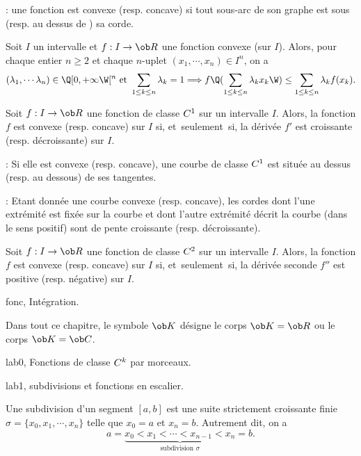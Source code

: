 \Remarque : une fonction est convexe (resp. concave) si tout sous-arc de son graphe est sous (resp. au dessus de ) sa corde.
\bigskip

\Propriete []  Soit $I$ un intervalle et $f:I\to\ob R$ une fonction convexe (sur $I$). Alors, pour chaque entier $n\ge2$ et chaque $n$-uplet $(x_1,\cdots,x_n)\in I^n$, on a 
$$
(\lambda_1,\cdots\lambda_n)\in\Q[0,+\infty\W[^n\mbox{ et }\sum_{1\le k\le n}\lambda_k=1\Longrightarrow 
f\Q(\sum_{1\le k\le n}\lambda_kx_k\W)\le \sum_{1\le k\le n}\lambda_k f(x_k).
$$

\Propriete []  Soit $f:I\to\ob R$ une fonction de classe $\sc C^1$ sur un intervalle $I$. Alors, la fonction $f$ est convexe (resp. concave) sur $I$ si, et~seulement~si, la dérivée $f'$ est croissante (resp. décroissante) sur $I$. 
\bigskip

\Remarque : Si elle est convexe (resp. concave), une courbe de classe $\sc C^1$ est située au dessus (resp. au dessous) de ses tangentes. 
\bigskip

\Remarque  : Etant donnée une courbe convexe (resp. concave), les cordes dont l'une extrémité est fixée sur la courbe et dont l'autre extrémité décrit la courbe (dans le sens positif) sont 
de pente croissante (resp. décroissante). 
\bigskip

\Propriete []  Soit $f:I\to\ob R$ une fonction de classe $\sc C^2$ sur un intervalle $I$. Alors, la fonction $f$ est convexe (resp. concave) sur $I$ si, et~seulement~si, la dérivée seconde $f''$ est positive (resp. négative) sur $I$. 
\bigskip

















\pagetitretrue


\Chapter fonc, Intégration. 
\bigskip

\noindent
Dans tout ce chapitre, le symbole $\ob K$ désigne le corps $\ob K=\ob R$ ou le corps $\ob K=\ob C$. 
\bigskip

\Section lab0, Fonctions de classe $\sc C^k$ par morceaux. 

\Subsection lab1, subdivisions et fonctions en escalier. 

\Definition []  Une subdivision d'un segment $[a,b]$ est une suite strictement croissante finie $\sigma=\{x_0,x_1,\cdots, x_n\}$ telle que $x_0=a$ et $x_n=b$. Autrement dit, on a
$$
a=\underbrace{x_0<x_1<\cdots <x_{n-1} < x_n}_{\mbox{subdivision $\sigma$}}=b. 
$$ 

